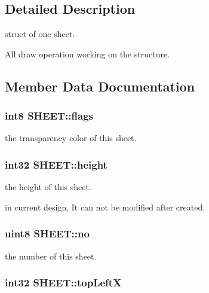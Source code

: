 \subsection{Detailed Description}
struct of one sheet. 

All draw operation working on the structure. 

\subsection{Member Data Documentation}
\hypertarget{struct_s_h_e_e_t_aab52a347b0e40e5b5d67a6110d672c2f}{}
\subsubsection[{flags}]{\setlength{\rightskip}{0pt plus 5cm}int8 S\+H\+E\+E\+T\+::flags}\label{struct_s_h_e_e_t_aab52a347b0e40e5b5d67a6110d672c2f}


the transparency color of this sheet. 

\hypertarget{struct_s_h_e_e_t_a62a3cdb715fff9c04d91fac8d08d2966}{}
\subsubsection[{height}]{\setlength{\rightskip}{0pt plus 5cm}int32 S\+H\+E\+E\+T\+::height}\label{struct_s_h_e_e_t_a62a3cdb715fff9c04d91fac8d08d2966}


the height of this sheet. 

in current design, It can not be modified after created. \hypertarget{struct_s_h_e_e_t_a09f948aae436f5740dc5107b820c517e}{}
\subsubsection[{no}]{\setlength{\rightskip}{0pt plus 5cm}uint8 S\+H\+E\+E\+T\+::no}\label{struct_s_h_e_e_t_a09f948aae436f5740dc5107b820c517e}


the number of this sheet. 

\hypertarget{struct_s_h_e_e_t_a76309d647cc77432f2743966699f2a6a}{}
\subsubsection[{top\+Left\+X}]{\setlength{\rightskip}{0pt plus 5cm}int32 S\+H\+E\+E\+T\+::top\+Left\+X}\label{struct_s_h_e_e_t_a76309d647cc77432f2743966699f2a6a}


